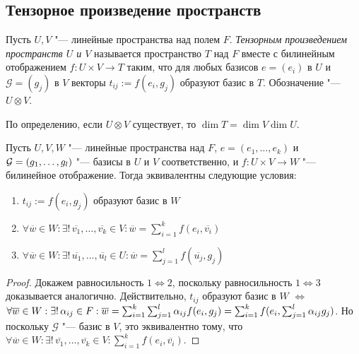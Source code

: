 \subsection{Тензорное произведение пространств}

\begin{definition}
	Пусть $U, V$ "--- линейные пространства над полем $F$. \textit{Тензорным произведением пространств $U$ и $V$} называется пространство $T$ над $F$ вместе с билинейным отображением $f: U \times V \rightarrow T$ таким, что для любых базисов $e = (e_i)$ в $U$ и $\mathcal{G} = (g_j)$ в $V$ векторы $t_{ij} := f({e_i}, {g_j})$ образуют базис в $T$. Обозначение "--- $U \otimes V$.
\end{definition}

\begin{note}
	По определению, если $U \otimes V$ существует, то $\dim{T} = \dim{V}\dim{U}$.
\end{note}

\begin{proposition}
	Пусть $U, V, W$ "--- линейные пространства над $F$, $e = ({e_1}, \dots, {e_k})$ и $\mathcal{G} \hm{=} ({g_1}, \dots, {g_l})$ "--- базисы в $U$ и $V$ соответственно, и $f: U \times V \rightarrow W$ "--- билинейное отображение. Тогда эквивалентны следующие условия:
	\begin{enumerate}
		\item ${t_{ij}} := f({e_i}, {g_j})$ образуют базис в $W$
		\item $\forall \overline{w} \in W: \exists!\,\overline{v_1}, \dots, \overline{v_k} \in V: \overline{w} = \sum_{i = 1}^kf({e_i}, \overline{v_i})$
		\item $\forall \overline{w} \in W: \exists!\,\overline{u_1}, \dots, \overline{u_l} \in U: \overline{w} = \sum_{j = 1}^lf(\overline{u_j}, {g_j})$
	\end{enumerate}
\end{proposition}

\begin{proof}
	Докажем равносильность $1 \Leftrightarrow 2$, поскольку равносильность $1 \Leftrightarrow 3$ доказывается аналогично. Действительно, ${t_{ij}}$ образуют базис в $W$ $\Leftrightarrow$ $\forall \overline{w} \in W: \exists!\,\alpha_{ij} \in F: \overline{w} \hm{=} \sum_{i = 1}^k\sum_{j = 1}^l\alpha_{ij}f({e_i}, {g_j}) = \sum_{i = 1}^kf({e_i}, \sum_{j = 1}^l\alpha_{ij}{g_j})$. Но поскольку $\mathcal{G}$ "--- базис в $V$, это эквивалентно тому, что $\forall \overline{w} \in W: \exists!\,\overline{v_1}, \dots, \overline{v_k} \in V: \sum_{i = 1}^kf({e_i}, \overline{v_i})$. 
\end{proof}

